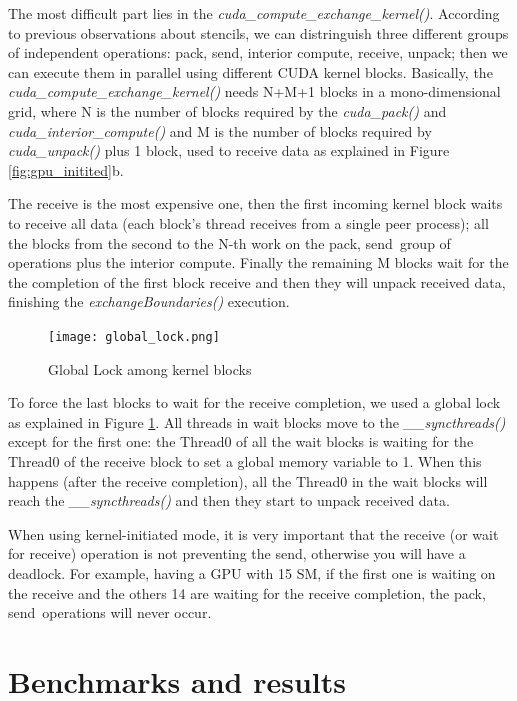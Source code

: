 \documentclass[conference]{IEEEtran}
\begin{document}
The most difficult part lies in the \textit{cuda\_compute\_exchange\_kernel()}. According to previous observations about stencils, we can distringuish three different groups of independent operations: \lbrack pack, send\rbrack, \lbrack interior compute\rbrack, \lbrack receive, unpack\rbrack; then we can execute them in parallel using different CUDA kernel blocks.
Basically, the \textit{cuda\_compute\_exchange\_kernel()} needs N+M+1 blocks in a mono-dimensional grid, where N is the number of blocks required by the \textit{cuda\_pack()} and \textit{cuda\_interior\_compute()} and M is the number of blocks required by \textit{cuda\_unpack()} plus 1 block, used to receive data as explained in Figure \ref{fig:gpu_initited}b.

The receive is the most expensive one, then the first incoming kernel block waits to receive all data (each block's thread receives from a single peer process); all the blocks from the second to the N-th work on the \lbrack pack, send\rbrack \ group of operations plus the \lbrack interior compute\rbrack. Finally the remaining M blocks wait for the the completion of the first block receive and then they will unpack received data, finishing the \textit{exchangeBoundaries()} execution.

\begin{figure}[h]
\texttt{[image: global\_lock.png]}
\caption{Global Lock among kernel blocks}
\label{fig:global_lock}
\end{figure}

To force the last blocks to wait for the receive completion, we used a global lock as explained in Figure \ref{fig:global_lock}. All threads in wait blocks move to the \textit{\_\_syncthreads()} except for the first one: the Thread0 of all the wait blocks is waiting for the Thread0 of the receive block to set a global memory variable to 1. When this happens (after the receive completion), all the Thread0 in the wait blocks will reach the \textit{\_\_syncthreads()} and then they start to unpack received data.

When using kernel-initiated mode, it is very important that the receive (or wait for receive) operation is not preventing the send, otherwise you will have a deadlock.
For example, having a GPU with 15 SM, if the first one is waiting on the receive and the others 14 are waiting for the receive completion, the \lbrack pack, send\rbrack \ operations will never occur.

\section{Benchmarks and results}
\end{document}
